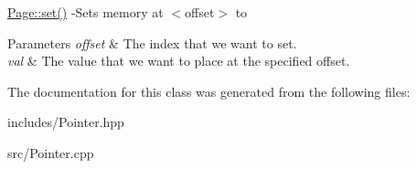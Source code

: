 \hyperlink{class_page_a4de67b2afdfe14758388f745a8a99d56}{Page\+::set()} -\/\+Sets memory at $<$offset$>$ to 


\begin{DoxyParams}{Parameters}
{\em offset} & The index that we want to set. \\
\hline
{\em val} & The value that we want to place at the specified offset. \\
\hline
\end{DoxyParams}


The documentation for this class was generated from the following files\+:\begin{DoxyCompactItemize}
\item 
includes/Pointer.\+hpp\item 
src/Pointer.\+cpp\end{DoxyCompactItemize}
